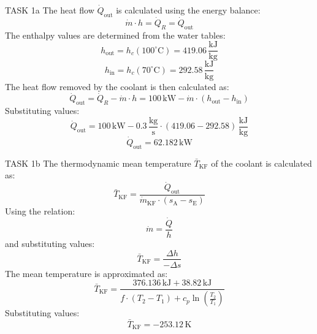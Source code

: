 TASK 1a  
The heat flow \( \dot{Q}_{\text{out}} \) is calculated using the energy balance:  
\[
\dot{m} \cdot h = \dot{Q}_R = \dot{Q}_{\text{out}}
\]  
The enthalpy values are determined from the water tables:  
\[
h_{\text{out}} = h_c(100^\circ\text{C}) = 419.06 \, \frac{\text{kJ}}{\text{kg}}
\]  
\[
h_{\text{in}} = h_c(70^\circ\text{C}) = 292.58 \, \frac{\text{kJ}}{\text{kg}}
\]  
The heat flow removed by the coolant is then calculated as:  
\[
\dot{Q}_{\text{out}} = \dot{Q}_R - \dot{m} \cdot h = 100 \, \text{kW} - \dot{m} \cdot (h_{\text{out}} - h_{\text{in}})
\]  
Substituting values:  
\[
\dot{Q}_{\text{out}} = 100 \, \text{kW} - 0.3 \, \frac{\text{kg}}{\text{s}} \cdot (419.06 - 292.58) \, \frac{\text{kJ}}{\text{kg}}
\]  
\[
\dot{Q}_{\text{out}} = 62.182 \, \text{kW}
\]  

TASK 1b  
The thermodynamic mean temperature \( \bar{T}_{\text{KF}} \) of the coolant is calculated as:  
\[
\bar{T}_{\text{KF}} = \frac{\dot{Q}_{\text{out}}}{\dot{m}_{\text{KF}} \cdot (s_{\text{A}} - s_{\text{E}})}
\]  
Using the relation:  
\[
\dot{m} = \frac{\dot{Q}}{h}
\]  
and substituting values:  
\[
\bar{T}_{\text{KF}} = \frac{\Delta h}{-\Delta s}
\]  
The mean temperature is approximated as:  
\[
\bar{T}_{\text{KF}} = \frac{376.136 \, \text{kJ} + 38.82 \, \text{kJ}}{f \cdot (T_2 - T_1) + c_p \ln \left( \frac{T_2}{T_1} \right)}
\]  
Substituting values:  
\[
\bar{T}_{\text{KF}} = -253.12 \, \text{K}
\]